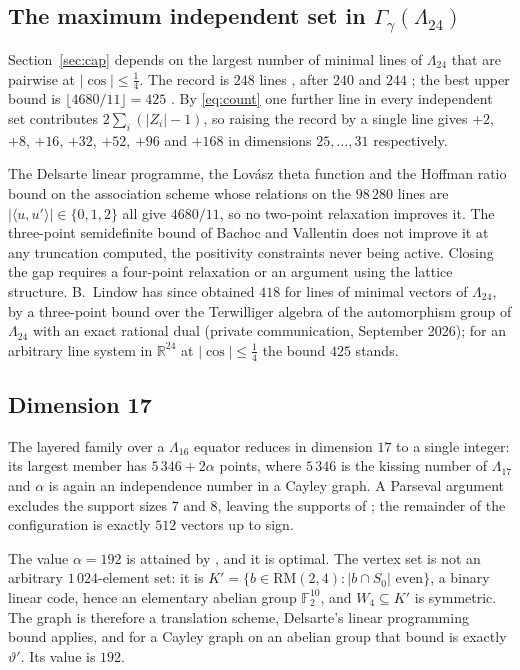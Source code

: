 \documentclass[11pt]{amsart}
\theoremstyle{remark}
\newcommand{\Leech}{\Lambda_{24}}
\newcommand{\ip}[2]{\langle #1,#2\rangle}
\newcommand{\R}{\mathbb{R}}
\begin{document}
\subsection{The maximum independent set in \texorpdfstring{$\Gamma_\gamma(\Leech)$}{Gamma(Leech)}}\label{ss:class}

Section~\ref{sec:cap} depends on the largest number of minimal lines of $\Leech$
that are pairwise at $|\cos|\le\tfrac14$. The record is $248$ lines
\cite{ma-etal2025}, after $240$ \cite{cohn-jiao-kumar-torquato2011} and $244$
\cite{kallal-kan-wang2017}; the best upper bound is $\lfloor 4680/11\rfloor=425$
\cite[\S7]{cohn-jiao-kumar-torquato2011}. By \eqref{eq:count} one further line in
every independent set contributes $2\sum_i(|Z_i|-1)$, so raising the record by a
single line gives $+2$, $+8$, $+16$, $+32$, $+52$, $+96$ and $+168$ in dimensions
$25,\dots,31$ respectively.

The Delsarte linear programme, the Lov\'asz theta function and the Hoffman ratio
bound on the association scheme whose relations on the $98\,280$ lines are
$|\ip{u}{u'}|\in\{0,1,2\}$ all give $4680/11$, so no two-point relaxation
improves it. The three-point semidefinite bound of Bachoc and
Vallentin \cite{bachoc-vallentin2008} does not improve it at any truncation
computed, the positivity constraints never being active. Closing the gap requires a four-point relaxation
or an argument using the lattice structure. B.~Lindow has since obtained $418$
for lines of minimal vectors of $\Leech$, by a three-point bound over the
Terwilliger algebra of the automorphism group of $\Leech$ with an exact rational
dual (private communication, September 2026); for an arbitrary line system in
$\R^{24}$ at $|\cos|\le\tfrac14$ the bound $425$ stands.

\subsection{Dimension 17}\label{ss:d17}

The layered family over a $\Lambda_{16}$ equator reduces in dimension $17$ to a
single integer: its largest member has $5\,346+2\alpha$ points, where $5\,346$ is
the kissing number of $\Lambda_{17}$ and $\alpha$ is again an independence number
in a Cayley graph. A Parseval argument excludes the support sizes $7$ and $8$,
leaving the supports of \cite{cohn-li2024}; the remainder of the configuration is
exactly $512$ vectors up to sign.

The value $\alpha=192$ is attained by \cite{cohn-li2024}, and it is optimal. The
vertex set is not an arbitrary $1\,024$-element set: it is
$K'=\{b\in\mathrm{RM}(2,4):|b\cap S_0|\text{ even}\}$, a binary linear code, hence
an elementary abelian group $\mathbb{F}_2^{10}$, and $W_4\subseteq K'$ is symmetric.
The graph is therefore a translation scheme, Delsarte's linear programming bound
applies, and for a Cayley graph on an abelian group that bound is exactly
$\vartheta'$. Its value is $192$.
\end{document}
